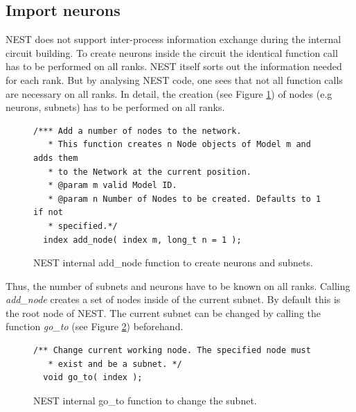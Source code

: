 
\lstset{escapechar=@,style=cppcode}

\subsection{Import neurons}
NEST does not support inter-process information exchange during the internal circuit building. 
To create neurons inside the circuit the identical function call has to be
performed on all ranks. NEST itself sorts out the information needed for each rank.
But by analysing NEST code, one sees that not all function calls are necessary on all ranks.
In detail, the creation (see Figure \ref{code:addnode}) of nodes (e.g neurons, subnets) has to be performed on all ranks.
\begin{figure}[ht!]
\begin{lstlisting}[style=cppcode]
/*** Add a number of nodes to the network.
   * This function creates n Node objects of Model m and adds them
   * to the Network at the current position.
   * @param m valid Model ID.
   * @param n Number of Nodes to be created. Defaults to 1 if not
   * specified.*/
  index add_node( index m, long_t n = 1 );
\end{lstlisting}
\caption{NEST internal add\_{}node function to create neurons and subnets.}
\label{code:addnode}
\end{figure}
Thus, the number of subnets and neurons have to be known on all ranks.
Calling \emph{add\_node} creates a set of nodes inside of the current subnet.
By default this is the root node of NEST.
The current subnet can be changed by calling the function \emph{go\_to} (see Figure \ref{code:goto}) beforehand.
\begin{figure}[ht!]
\begin{lstlisting}[style=cppcode]
/** Change current working node. The specified node must
   * exist and be a subnet. */
  void go_to( index );
\end{lstlisting}
\caption{NEST internal go\_{}to function to change the subnet.}
\label{code:goto}
\end{figure}
